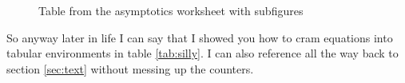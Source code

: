 \documentclass{article}
\begin{document}
\begin{figure}[h!]
  \centering
           \caption{Table from the asymptotics worksheet with subfigures}
           \label{fig:subfigs}
\end{figure}

So anyway later in life I can say that I showed you how to cram equations into
tabular environments in table \ref{tab:silly}. I can also reference all the
way back to section \ref{sec:text} without messing up the counters.
\end{document}
